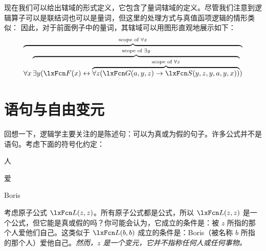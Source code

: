 
现在我们可以给出辖域的形式定义，它包含了量词辖域的定义。尽管我们注意到逻辑算子可以是联结词也可以是量词，但这里的处理方式与真值函项逻辑的情形类似：
因此，对于前面例子中的量词，其辖域可以用图形直观地展示如下：
$$\overbrace{\forall x \overbrace{\exists y (\atom{F}{x} \eiff
\overbrace{\forall z (\atom{G}{a,y,z} \eif
\atom{S}{y,z,y,a,y,x})}^{\text{scope of }\forall
z}}^{\text{scope of }\exists y})}^{\text{scope of
$\forall x$}}$$



\section{语句与自由变元}\label{s:FreeVars}

回想一下，逻辑学主要关注的是陈述句：可以为真或为假的句子。许多公式并不是语句。考虑下面的符号化约定：
	\begin{ekey}
		\item[\text{论域}] 人
		\item[\atom{L}{x,y}]  爱 
		\item[b] Boris
	\end{ekey}
考虑原子公式 $\atom{L}{z,z}$。所有原子公式都是公式，所以 $\atom{L}{z,z}$ 是一个公式，但它能是真或假的吗？你可能会认为，它成立的条件是：被 $z$ 所指的那个人爱他们自己。这类似于 $\atom{L}{b,b}$ 成立的条件是：Boris（被名称 $b$ 所指的那个人）爱他自己。\emph{然而，$z$ 是一个变元，它并不指称任何人或任何事物。}

